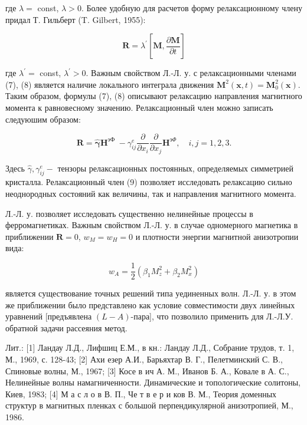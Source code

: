 \documentclass[10pt]{article}
\begin{document}
где $\lambda=$ const, $\lambda>0$. Более удобную для расчетов форму релаксационному члену придал Т. Гильберт (T. Gilbert, 1955):



\[

\boldsymbol{R}=\lambda^{\prime}\left[\boldsymbol{M}, \frac{\partial \boldsymbol{M}}{\partial t}\right]

\]



где $\lambda^{\prime}=$ const, $\lambda^{\prime}>0$. Важным свойством Л.-Л. у. с релаксационными членами (7), (8) является наличие локального интеграла движения $\boldsymbol{M}^{2}(\boldsymbol{x}, t)=\boldsymbol{M}_{0}^{2}(\boldsymbol{x})$. Таким образом, формулы (7), (8) описывают релаксацию направления магнитного момента к равновесному значению. Релаксационный член можно записать следуюшим образом:



\[

\boldsymbol{R}=\hat{\boldsymbol{\gamma}} \boldsymbol{H}^{\text {эФ }}-\gamma_{i j}^{e} \frac{\partial}{\partial x_{i}} \frac{\partial}{\partial x_{j}} \boldsymbol{H}^{э \Phi}, \quad i, j=1,2,3 .

\]



Здесь $\hat{\gamma}, \gamma_{i j}^{e}-$ тензоры релаксационных постоянных, определяемых симметрией кристалла. Релаксационный член (9) позволяет исследовать релаксацию сильно неоднородных состояний как величины, так и направления магнитного момента.



Л.-Л. у. позволяет исследовать существенно нелинейные процессы в ферромагнетиках. Важным свойством Л.-Л. у. в случае одномерного магнетика в приближении $\boldsymbol{R}=0$, $w_{M}=w_{H}=0$ и плотности энергии магнитной анизотропии вида:



\[

w_{A}=\frac{1}{2}\left(\beta_{1} M_{z}^{2}+\beta_{2} M_{x}^{2}\right)

\]



является существование точных решений типа уединенных волн. Л.-Л. у. в этом же приближении было представлено как условие совместимости двух линейных уравнений [предъявлена $(L-A)$-пара], что позволило применить для Л.-Л.У. обратной задачи рассеяния метод.



Лит.: [1] Ландау Л.Д., Лифшиц Е.М., в кн.: Ландау Л.Д., Собрание трудов, т. 1, М., 1969, с. 128-43; [2] Ахи езер А.И., Барьяхтар В. Г., Пелетминский С. В., Спиновые волны, М., 1967; [3] Косе в ич А. М., Иванов Б. А., Ковале в А. С., Нелинейные волны намагниченности. Динамические и топологические солитоны, Киев, 1983; [4] М а с л о в В. П., Че т в е р и ков В. М., Теория доменных структур в магнитных пленках с большой перпендикулярной анизотропией, М., 1986.
\end{document}
